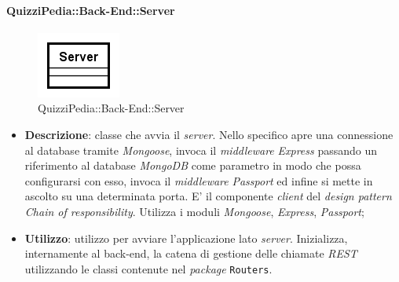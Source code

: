 	\paragraph{QuizziPedia::Back-End::Server}
\label{QuizziPedia::Back-End::Server}
\begin{figure}[ht]
	\centering
	\includegraphics[scale=0.8]{UML/Classi/Back-End/QuizziPedia_Back-End_Server.png}
	\caption{QuizziPedia::Back-End::Server}
\end{figure}
\FloatBarrier
	\begin{itemize}
		\item \textbf{Descrizione}:
		classe che avvia il \textit{server}. Nello specifico apre una connessione al database tramite \textit{Mongoose}, invoca il \textit{middleware} \textit{Express} passando un riferimento al database \textit{MongoDB} come parametro in modo  che possa configurarsi con esso, invoca il \textit{middleware} \textit{Passport} ed infine si mette in ascolto su una determinata porta. E' il componente \textit{client} del \textit{design pattern} \textit{Chain of responsibility}. Utilizza i moduli \textit{Mongoose}, \textit{Express}, \textit{Passport};
		\item \textbf{Utilizzo}:
		utilizzo per avviare l'applicazione lato \textit{server}. Inizializza, internamente al back-end, la catena di gestione delle chiamate \textit{REST} utilizzando le classi contenute nel \textit{package} \texttt{Routers}.
	\end{itemize}
	